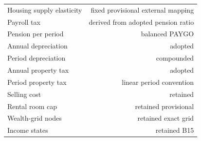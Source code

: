 \begin{tabular}{lr}
Housing supply elasticity & fixed provisional external mapping \\
Payroll tax & derived from adopted pension ratio \\
Pension per period & balanced PAYGO \\
Annual depreciation & adopted \\
Period depreciation & compounded \\
Annual property tax & adopted \\
Period property tax & linear period convention \\
Selling cost & retained \\
Rental room cap & retained provisional \\
Wealth-grid nodes & retained exact grid \\
Income states & retained B15 \\
\bottomrule
\end{tabular}
